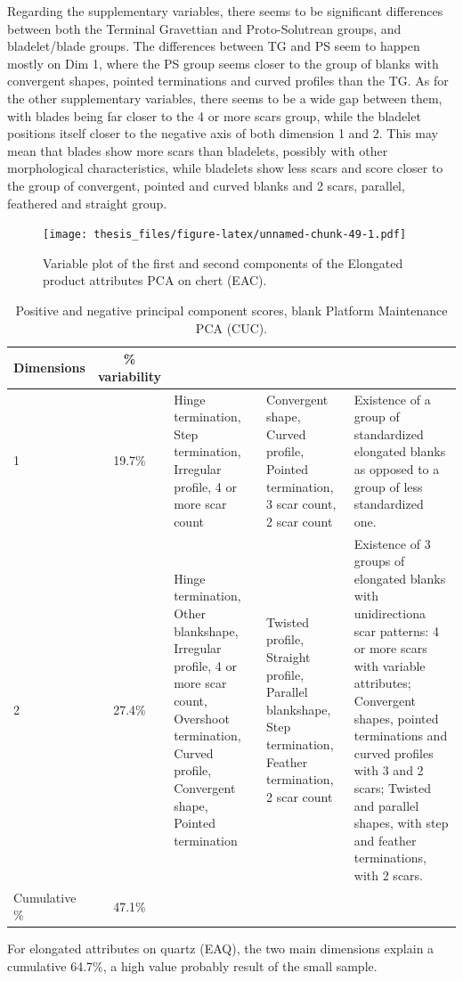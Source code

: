 \documentclass[12pt,twoside]{reedthesis}
\begin{document}
Regarding the supplementary variables, there seems to be significant differences between both the Terminal Gravettian and Proto-Solutrean groups, and bladelet/blade groups. The differences between TG and PS seem to happen mostly on Dim 1, where the PS group seems closer to the group of blanks with convergent shapes, pointed terminations and curved profiles than the TG. As for the other supplementary variables, there seems to be a wide gap between them, with blades being far closer to the 4 or more scars group, while the bladelet positions itself closer to the negative axis of both dimension 1 and 2. This may mean that blades show more scars than bladelets, possibly with other morphological characteristics, while bladelets show less scars and score closer to the group of convergent, pointed and curved blanks and 2 scars, parallel, feathered and straight group.
\begin{figure}
\centering
\texttt{[image: thesis\_files/figure-latex/unnamed-chunk-49-1.pdf]}
\caption{\label{fig:unnamed-chunk-49}Variable plot of the first and second components of the Elongated product attributes PCA on chert (EAC).}
\end{figure}
\begin{table}

\caption{\label{tab:unnamed-chunk-50}Positive and negative principal component scores, blank Platform Maintenance PCA (CUC).}
\centering
\begin{tabular}[t]{lc>{\raggedright\arraybackslash}p{3cm}>{\raggedright\arraybackslash}p{3cm}>{\raggedright\arraybackslash}p{3cm}}
\toprule
\multicolumn{1}{c}{\textbf{Dimensions}} & \multicolumn{1}{c}{\textbf{\% variability}} & \multicolumn{1}{>{\centering\arraybackslash}p{3cm}}{\textbf{+}} & \multicolumn{1}{>{\centering\arraybackslash}p{3cm}}{\textbf{-}} & \multicolumn{1}{>{\centering\arraybackslash}p{3cm}}{\textbf{Interpretation}}\\
\midrule
1 & 19.7\% & Hinge termination, Step termination, Irregular profile, 4 or more scar count & Convergent shape, Curved profile, Pointed termination, 3 scar count, 2 scar count & Existence of a group of standardized elongated blanks as opposed to a group of less standardized one.\\
2 & 27.4\% & Hinge termination, Other blankshape, Irregular profile, 4 or more scar count, Overshoot termination, Curved profile, Convergent shape, Pointed termination & Twisted profile, Straight profile, Parallel blankshape, Step termination, Feather termination, 2 scar count & Existence of 3 groups of elongated blanks with unidirectiona scar patterns: 4 or more scars with variable attributes; Convergent shapes, pointed terminations and curved profiles with 3 and 2 scars; Twisted and parallel shapes, with step and feather terminations, with 2 scars.\\
Cumulative \% & 47.1\% &  &  & \\
\bottomrule
\end{tabular}
\end{table}
For elongated attributes on quartz (EAQ), the two main dimensions explain a cumulative 64.7\%, a high value probably result of the small sample.
\end{document}
